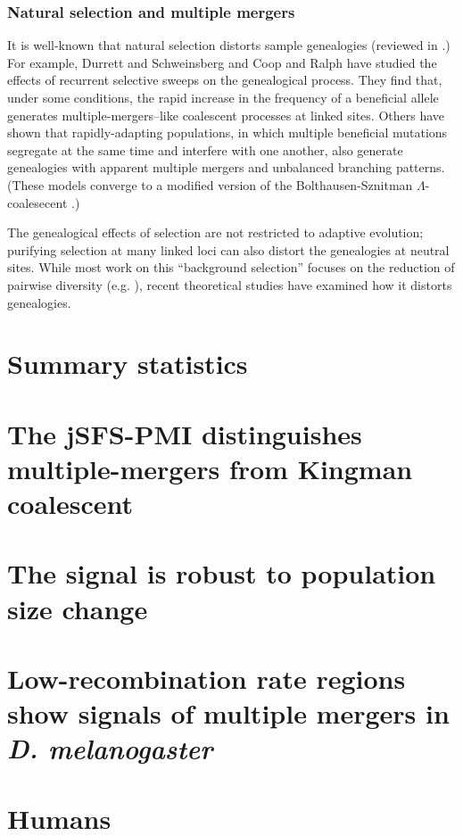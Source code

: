 \documentclass[11pt, letterpaper]{article}   	%
\begin{document}
\subsubsection*{Natural selection and multiple mergers}

It is well-known that natural selection distorts sample genealogies (reviewed in \cite{neher:2013}.)
For example, Durrett and Schweinsberg \cite{durrett:schweinsberg:2005} and Coop and Ralph \cite{coop:ralph:2013} have studied the effects of recurrent selective sweeps on the genealogical process.
They find that, under some conditions, the rapid increase in the frequency of a beneficial allele generates multiple-mergers--like coalescent processes at linked sites.
Others \cite{} have shown that rapidly-adapting populations, in which multiple beneficial mutations segregate at the same time and interfere with one another, also generate genealogies with apparent multiple mergers and unbalanced branching patterns.
(These models converge to a modified version of the Bolthausen-Sznitman $\Lambda$-coalesecent \cite{neher:hallatscheck:2013}.)

The genealogical effects of selection are not restricted to adaptive evolution; purifying selection at many linked loci can also distort the genealogies at neutral sites.
While most work on this ``background selection'' \cite{charlesworth:etal:1993} focuses on the reduction of pairwise diversity (e.g. \cite{mcvicker}), recent theoretical studies have examined how it distorts genealogies.
 


\section*{Summary statistics}

\section*{The jSFS-PMI distinguishes multiple-mergers from Kingman coalescent}

\section*{The signal is robust to population size change}

\section*{Low-recombination rate regions show signals of multiple mergers in \textit{D. melanogaster}}

\section*{Humans}
\end{document}
